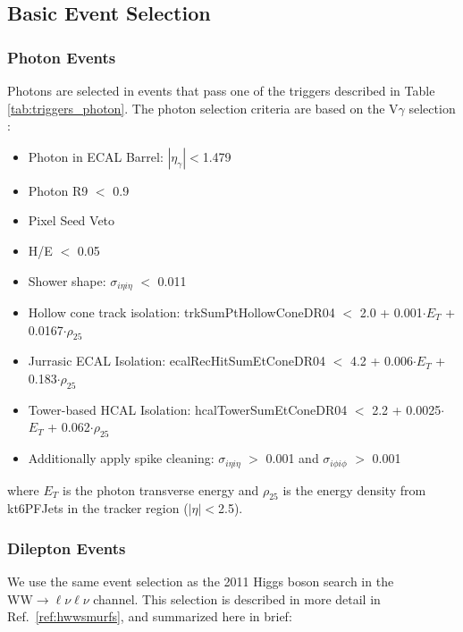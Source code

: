 \clearpage

\subsection{Basic Event Selection}

\subsubsection{Photon Events}

Photons are selected in events that pass one of the triggers described in Table \ref{tab:triggers_photon}.
The photon selection criteria are based on the $\mathrm{V}\gamma$ selection \cite{ref:vgamma}:

\begin{itemize}
\item Photon in ECAL Barrel: $|\eta_\gamma|$$<$1.479
\item Photon R9 $<$ 0.9
\item Pixel Seed Veto
\item H/E $<$ 0.05
\item Shower shape: $\sigma_{i\eta i\eta}$ $<$ 0.011
\item Hollow cone track isolation: trkSumPtHollowConeDR04 $<$ 2.0 + 0.001$\cdot$$E_T$ + 0.0167$\cdot$$\rho_{25}$
\item Jurrasic ECAL Isolation: ecalRecHitSumEtConeDR04 $<$ 4.2 + 0.006$\cdot$$E_T$ + 0.183$\cdot$$\rho_{25}$
\item Tower-based HCAL Isolation: hcalTowerSumEtConeDR04 $<$ 2.2 + 0.0025$\cdot$$E_T$ + 0.062$\cdot$$\rho_{25}$
\item Additionally apply spike cleaning: $\sigma_{i\eta i\eta}$ $>$ 0.001 and $\sigma_{i\phi i\phi}$ $>$ 0.001
\end{itemize}

where $E_T$ is the photon transverse energy and $\rho_{25}$ is the energy density from kt6PFJets in the tracker region ($|\eta|$$<$2.5).

\subsubsection{Dilepton Events}

We use the same event selection as the 2011 Higgs boson search in the  $\mathrm{WW}\rightarrow\ell\nu\ell\nu$ channel.
This selection is described in more detail in Ref.~\ref{ref:hwwsmurfs}, and summarized here in brief:


